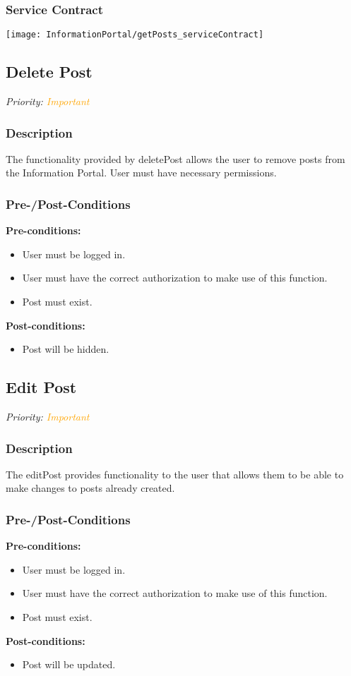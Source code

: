 \subsubsection{Service Contract}
\texttt{[image: InformationPortal/getPosts\_serviceContract]}

\subsection{Delete Post}
\textit{Priority: \textcolor{orange}{Important}}

\subsubsection{Description}
The functionality provided by deletePost allows the user to remove posts from the Information Portal. User must have necessary permissions.



\subsubsection{Pre-/Post-Conditions}
	\textbf{Pre-conditions:}
	\begin{itemize}
		\item User must be logged in.
		\item User must have the correct authorization to make use of this function.
		\item Post must exist.
	\end{itemize}
	\textbf{Post-conditions:}
	\begin{itemize}
		\item Post will be hidden.
	\end{itemize}

\subsection{Edit Post}
\textit{Priority: \textcolor{orange}{Important}}

\subsubsection{Description}
The editPost provides functionality to the user that allows them to be able to make changes to posts already created.



\subsubsection{Pre-/Post-Conditions}
	\textbf{Pre-conditions:}
	\begin{itemize}
		\item User must be logged in.
		\item User must have the correct authorization to make use of this function.
		\item Post must exist.
	\end{itemize}
	\textbf{Post-conditions:}
	\begin{itemize}
		\item Post will be updated.
	\end{itemize}
